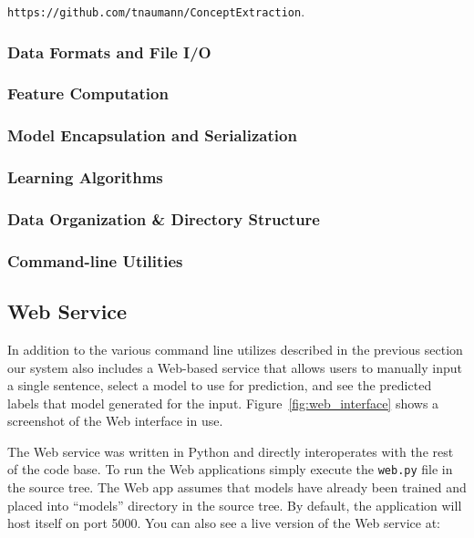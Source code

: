 \documentclass[preprint]{style}
\begin{document}
{\tt https://github.com/tnaumann/ConceptExtraction}.

\subsubsection{Data Formats and File I/O}

\subsubsection{Feature Computation}

\subsubsection{Model Encapsulation and Serialization}

\subsubsection{Learning Algorithms}

\subsubsection{Data Organization \& Directory Structure}

\subsubsection{Command-line Utilities}

\subsection{Web Service}

In addition to the various command line utilizes described in the previous section our system also includes a Web-based service that allows users to manually input a single sentence, select a model to use for prediction, and see the predicted labels that model generated for the input. Figure~\ref{fig:web_interface} shows a screenshot of the Web interface in use.

The Web service was written in Python and directly interoperates with the rest of the code base. To run the Web applications simply execute the {\tt web.py} file in the source tree. The Web app assumes that models have already been trained and placed into ``models'' directory in the source tree. By default, the application will host itself on port 5000. You can also see a live version of the Web service at:
\end{document}
